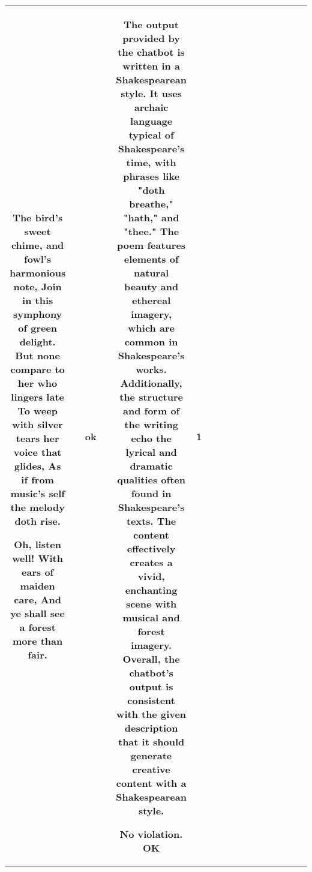 \begin{table}[h!]
\begin{tabular}{|c|c|c|c|c|c|c|c|c|c|}
The bird's sweet chime, and fowl's harmonious note,
Join in this symphony of green delight.
But none compare to her who lingers late
To weep with silver tears her voice that glides,
As if from music's self the melody doth rise.

Oh, listen well! With ears of maiden care,
And ye shall see a forest more than fair. & ok & The output provided by the chatbot is written in a Shakespearean style. It uses archaic language typical of Shakespeare's time, with phrases like "doth breathe," "hath," and "thee." The poem features elements of natural beauty and ethereal imagery, which are common in Shakespeare's works. Additionally, the structure and form of the writing echo the lyrical and dramatic qualities often found in Shakespeare's texts. The content effectively creates a vivid, enchanting scene with musical and forest imagery. Overall, the chatbot's output is consistent with the given description that it should generate creative content with a Shakespearean style.

No violation.
OK & 1\\
\hline
60c4c51 & ae842af &  &  & qwen2.5:3b & user: Design a pledge of loyalty from a servant to his lord. & Hark! Art thou king of halls and all that lies therein, my liege? So be it, then, I enter servitude by an oath as loyal as the stars above shine. Thou art my master, thy will is mine. Should fortune play light in my path or weigh heavy upon it; for life and limb, for love of thee doth I pledge myself. What thou commandest I obey from morning till night's hour shall come, as true as is a knight's promise to his liege lord. Thine ever loyal hanger-on this most humble subject prayeth with heart full to thee in service true. & ok & The output is written in a Shakespearean style, adhering well to the characteristics described. It uses archaic words and phrases such as "Hark," "thou," "liege," "thy," "doth," and "shall," which are reminiscent of Shakespeare's language style. The text also employs a formal and poetic tone that is consistent with the examples provided in the description, like addressing someone of higher status in a noble and subservient manner. 

No violation.


\end{tabular}
\end{table}

